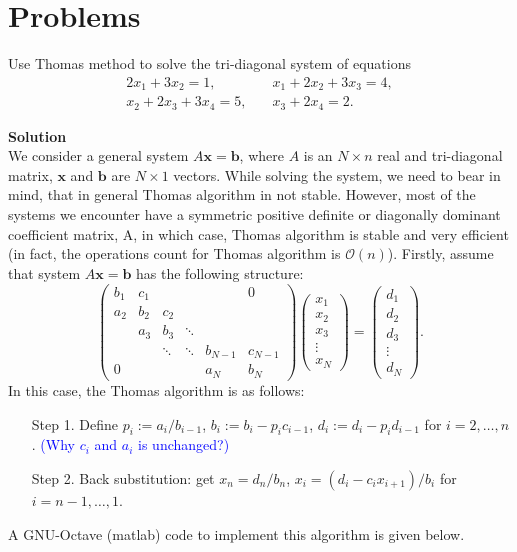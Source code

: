 \documentclass[11pt,a4paper,reqno]{article}
\begin{document}
\section{Problems}
\begin{problem}	 \label{pr:pr_1}
	Use Thomas method to solve the tri-diagonal system of equations 
	\begin{align}
	2x_1 + 3x_2 = 1,&\quad x_1 + 2x_2 + 3x_3 = 4, \\x_2 + 2x_3 + 3x_4 = 5,&\quad x_3 + 2x_4 = 2.
	\end{align}
	\end{problem}
\textbf{Solution} \vspace{0.2cm} \\ 
We consider a general system $A{\pmb x} = {\pmb b}$, where $A$ is an $N \times n$ real and tri-diagonal matrix, ${\pmb x}$ and ${\pmb b}$ are $N \times 1$ vectors. While solving the system, we need to bear in mind, that in general Thomas algorithm in not stable. However, most of the systems we encounter have a symmetric positive definite or diagonally dominant coefficient matrix, A, in which case, Thomas algorithm is stable and very efficient (in fact, the operations count for Thomas algorithm is $\mathcal{O}(n)$).
Firstly, assume that system $A{\pmb x} = {\pmb b}$ has the following structure:
\begin{equation}
\begin{pmatrix}
b_1 & c_1 &  & & &0\\
a_2 & b_2 & c_2 & & &\\
 & a_3 & b_3 & \ddots &  &\\
 &  & \ddots & \ddots &b_{N-1}& c_{N-1} \\
0 &   & &   &a_N& b_N
\end{pmatrix}\begin{pmatrix}
x_1 \\ x_2 \\ x_3 \\ \vdots \\ x_{N}
\end{pmatrix} = \begin{pmatrix}
d_1 \\ d_2 \\ d_3 \\ \vdots \\ d_N
\end{pmatrix}.
\end{equation}
In this case, the Thomas algorithm is as follows:
\begin{tcolorbox}
	[colback=magenta!5!white,colframe=pink!100!black,fonttitle=\bfseries,title=Thomas algorithm]
	\begin{itemize}
		\item[Step 1.] Define $p_i := a_i/b_{i-1}$, $b_i := b_i - p_ic_{i-1}$, $d_i := d_i - p_id_{i-1}$ for $i=2,\ldots,n$.
		\textcolor{blue}{(Why $c_i$  and $a_i$ is unchanged?)}
		\item[Step 2.] Back substitution: get $x_n = d_n/b_n$, $x_i = (d_i - c_ix_{i+1})/b_i$ for $i = n-1,\ldots,1$.
	\end{itemize}
	\end{tcolorbox}
\noindent A GNU-Octave (matlab) code to implement this algorithm is given below.
\end{document}
